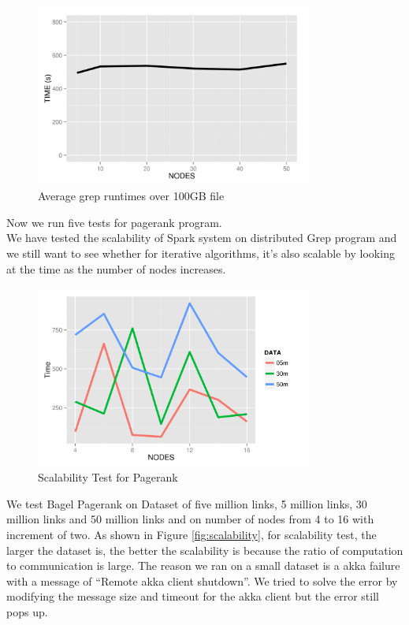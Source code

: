 \documentclass{article}
\begin{document}
    \begin{figure}[H]
        \centering
        \includegraphics[width=90mm]{images/bigDataTimes.png}
        \caption{Average grep runtimes over 100GB file}
        \label{fig:bigTime}
    \end{figure}

Now we run five tests for pagerank program.\\

We have tested the scalability of Spark system on distributed Grep program and we still want to see whether for iterative algorithms, it's also scalable by looking at the time as the number of nodes increases.\\

    \begin{figure}[H]
        \centering
        \includegraphics[width=90mm]{images/scalability.png}
        \caption{Scalability Test for Pagerank}
        \label{fig:bscalability}
    \end{figure}

We test Bagel Pagerank on Dataset of five million links, 5 million links, 30 million links and 50 million links and on number of nodes from 4 to 16 with increment of two. As shown in Figure \ref{fig:scalability}, for scalability test, the larger the dataset is, the better the scalability is because the ratio of computation to communication is large. The reason we ran on a small dataset is a akka failure with a message of “Remote akka client shutdown”. We tried to solve the error by modifying the message size and timeout for the akka client but the error still pops up.\\
\end{document}
